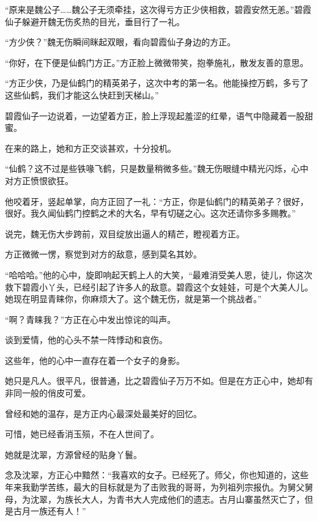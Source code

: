 
\begin{this_body}

“原来是魏公子……魏公子无须牵挂，这次得亏方正少侠相救，碧霞安然无恙。”碧霞仙子躲避开魏无伤炙热的目光，垂目行了一礼。

“方少侠？”魏无伤瞬间眯起双眼，看向碧霞仙子身边的方正。

“你好，在下便是仙鹤门方正。”方正脸上微微带笑，抱拳施礼，散发友善的意思。

“方正少侠，乃是仙鹤门的精英弟子，这次中考的第一名。他能操控万鹤，多亏了这些仙鹤，我们才能这么快赶到天梯山。”

碧霞仙子一边说着，一边望着方正，脸上浮现起羞涩的红晕，语气中隐藏着一股甜蜜。

在来的路上，她和方正交谈甚欢，十分投机。

“仙鹤？这不过是些铁喙飞鹤，只是数量稍微多些。”魏无伤眼缝中精光闪烁，心中对方正愤恨欲狂。

他咬着牙，竖起单掌，向方正回了一礼：“方正，你是仙鹤门的精英弟子？很好，很好。我久闻仙鹤门控鹤之术的大名，早有切磋之心。这次还请你多多赐教。”

说完，魏无伤大步跨前，双目绽放出逼人的精芒，瞪视着方正。

方正微微一愣，察觉到对方的敌意，感到莫名其妙。

“哈哈哈。”他的心中，旋即响起天鹤上人的大笑，“最难消受美人恩，徒儿，你这次救下碧霞小丫头，已经引起了许多人的敌意。碧霞这个女娃娃，可是个大美人儿。她现在明显青睐你，你麻烦大了。这个魏无伤，就是第一个挑战者。”

“啊？青睐我？”方正在心中发出惊诧的叫声。

谈到爱情，他的心头不禁一阵悸动和哀伤。

这些年，他的心中一直存在着一个女子的身影。

她只是凡人。很平凡，很普通，比之碧霞仙子万万不如。但是在方正心中，她却有非同一般的俏皮可爱。

曾经和她的温存，是方正内心最深处最美好的回忆。

可惜，她已经香消玉殒，不在人世间了。

她就是沈翠，方源曾经的贴身丫鬟。

念及沈翠，方正心中黯然：“我喜欢的女子。已经死了。师父，你也知道的，这些年来我勤学苦练，最大的目标就是为了击败我的哥哥，为列祖列宗报仇。为舅父舅母，为沈翠，为族长大人，为青书大人完成他们的遗志。古月山寨虽然灭亡了，但是古月一族还有人！”


\end{this_body}

